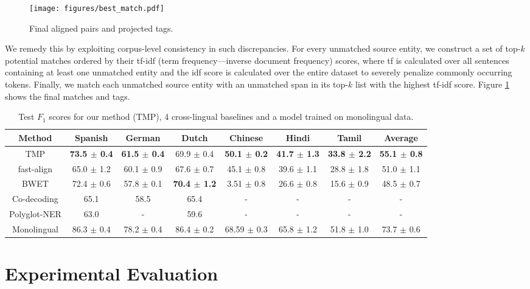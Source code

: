\documentclass[11pt,a4paper]{article}
\begin{document}
\begin{figure}[htb]
    \centering
    \texttt{[image: figures/best\_match.pdf]}
    \caption{Final aligned pairs and projected tags.}
\label{fig:best-match}
\end{figure}

We remedy this by exploiting corpus-level 
consistency in such discrepancies.
For every unmatched source entity, 
we construct a set of top-$k$ potential matches 
ordered by their tf-idf (term frequency---inverse document frequency) scores, 
where tf is calculated over all sentences 
containing at least one unmatched entity 
and the idf score is calculated over the entire dataset 
to severely penalize commonly occurring tokens. 
Finally, we match each unmatched source entity 
with an unmatched span in its top-$k$ list with the highest tf-idf score. Figure \ref{fig:best-match} shows the final matches and tags.



\begin{table*}[!h]
\small
\centering
\begin{tabularx}{0.95\textwidth}{cccccccc}
\toprule
\bf Method & \bf Spanish & \bf German & \bf Dutch & \bf Chinese & \bf Hindi & \bf Tamil & \bf Average \\
\toprule
TMP & \bf 73.5 $\pm$ 0.4 & \bf 61.5 $\pm$ 0.4 & 69.9 $\pm$ 0.4 &
\bf 50.1 $\pm$  0.2 &
\bf 41.7 $\pm$  1.3 & \bf 33.8 $\pm$ 2.2 & \bf 55.1 $\pm$ 0.8 \\
\midrule
fast-align & 65.0 $\pm$ 1.2 & 
60.1 $\pm$ 0.9 &
67.6 $\pm$ 0.7 &
45.1 $\pm$ 0.8 &
39.6 $\pm$ 1.1 & 
28.8 $\pm$ 1.8 & 
51.0 $\pm$ 1.1 \\
BWET & 72.4 $\pm$ 0.6 & 
57.8 $\pm$ 0.1 & \bf 70.4 $\pm$ 1.2 &
3.51 $\pm$ 0.8 &
26.6 $\pm$ 0.8 & 
15.6 $\pm$ 0.9 & 
48.5 $\pm$ 0.7 \\
Co-decoding & 65.1 & 58.5 & 65.4 & - & - & - & - \\
Polyglot-NER & 63.0 & - & 59.6 & - & - & - & - \\
\midrule
Monolingual & 86.3 $\pm$ 0.4 & 78.2 $\pm$ 0.4 & 86.4 $\pm$ 0.2 & 
68.59 $\pm$ 0.3 & 
65.8 $\pm$ 1.2 & 51.8 $\pm$ 1.0 & 73.7 $\pm$ 0.6 \\
\bottomrule
\end{tabularx}
\caption{Test $F_1$ scores for our method (TMP), 4 cross-lingual baselines and a model trained on monolingual data.}
\label{tab:results}
\end{table*} 
\section{Experimental Evaluation}
\end{document}
